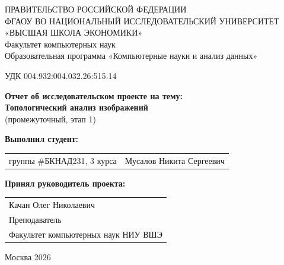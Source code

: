 \begin{titlepage}
\newpage

{
\begin{center}
ПРАВИТЕЛЬСТВО РОССИЙСКОЙ ФЕДЕРАЦИИ\\
ФГАОУ ВО НАЦИОНАЛЬНЫЙ ИССЛЕДОВАТЕЛЬСКИЙ УНИВЕРСИТЕТ\\
«ВЫСШАЯ ШКОЛА ЭКОНОМИКИ»
\\
\bigskip
Факультет компьютерных наук\\
Образовательная программа «Компьютерные науки и анализ данных»
\end{center}
}

\vspace{2em}
УДК 004.932:004.032.26:515.14 %
\vspace{4em}

\begin{center}
{\bf Отчет об исследовательском проекте на тему:}\\
{\bf Топологический анализ изображений}\\
(промежуточный, этап 1)
\end{center}

\vspace{2em}

{\bf Выполнил студент: \vspace{2mm}}

{
\begin{tabular}{l@{\hskip 1.5cm}l}
группы \#БКНАД231, 3 курса & Мусалов Никита Сергеевич
\end{tabular}}

\vspace{1em}
{\bf Принял руководитель проекта: \vspace{2mm}}

{
\begin{tabular}{l}
Качан Олег Николаевич\\
Преподаватель\\
Факультет компьютерных наук НИУ ВШЭ 
\end{tabular}}

\vspace{\fill}

\begin{center}
Москва 2026
\end{center}

\end{titlepage}